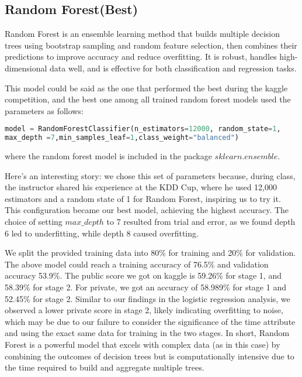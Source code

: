 \subsection*{Random Forest(Best)}
Random Forest is an ensemble learning method that builds multiple decision trees using bootstrap sampling and random feature selection, then combines their predictions to improve accuracy and reduce overfitting. It is robust, handles high-dimensional data well, and is effective for both classification and regression tasks.

This model could be said as the one that performed the best during the kaggle competition, and the best one among all trained random forest models used the parameters as follows:

\begin{lstlisting}[language=Python]
model = RandomForestClassifier(n_estimators=12000, random_state=1,
max_depth =7,min_samples_leaf=1,class_weight="balanced")
\end{lstlisting}
where the random forest model is included in the package $sklearn.ensemble$.

Here's an interesting story: we chose this set of parameters because, during class, the instructor shared his experience at the KDD Cup, where he used 12,000 estimators and a random state of 1 for Random Forest, inspiring us to try it. This configuration became our best model, achieving the highest accuracy. The choice of setting $max\_depth$ to 7 resulted from trial and error, as we found depth 6 led to underfitting, while depth 8 caused overfitting. 

We split the provided training data into 80\% for training and 20\% for validation. The above model could reach a training accuracy of 76.5\% and validation accuracy 53.9\%. The public score we got on kaggle is 59.26\% for stage 1, and 58.39\% for stage 2. For private, we got an accuracy of 58.989\% for stage 1 and 52.45\% for stage 2. Similar to our findings in the logistic regression analysis, we observed a lower private score in stage 2, likely indicating overfitting to noise, which may be due to our failure to consider the significance of the time attribute and using the exact same data for training in the two stages. In short, Random Forest is a powerful model that excels with complex data (as in this case) by combining the outcomes of decision trees but is computationally intensive due to the time required to build and aggregate multiple trees. 
